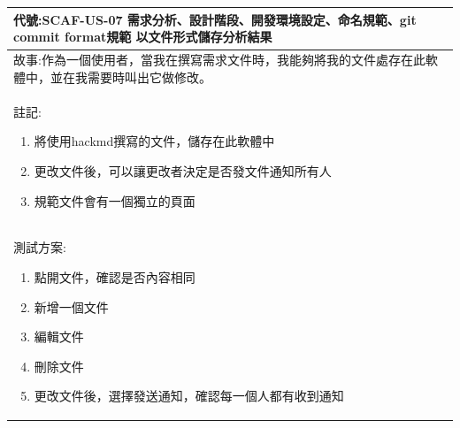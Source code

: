 \documentclass{report}
\begin{document}
\subsection*{}
\fontsize{12}{20}\selectfont
\begin{tabularx}{\textwidth}{|X|}
  \hline
  代號:SCAF-US-07 需求分析、設計階段、開發環境設定、命名規範、git commit format規範 以文件形式儲存分析結果 \\
  \hline
  故事:作為一個使用者，當我在撰寫需求文件時，我能夠將我的文件處存在此軟體中，並在我需要時叫出它做修改。 \\
  \hline
  註記:
  \begin{enumerate}
    \item 將使用hackmd撰寫的文件，儲存在此軟體中
    \item 更改文件後，可以讓更改者決定是否發文件通知所有人
    \item 規範文件會有一個獨立的頁面
  \end{enumerate} \\
  \hline
  測試方案:
  \begin{enumerate}
    \item 點開文件，確認是否內容相同
    \item 新增一個文件
    \item 編輯文件
    \item 刪除文件
    \item 更改文件後，選擇發送通知，確認每一個人都有收到通知
  \end{enumerate} \\
  \hline
\end{tabularx}
\end{document}
